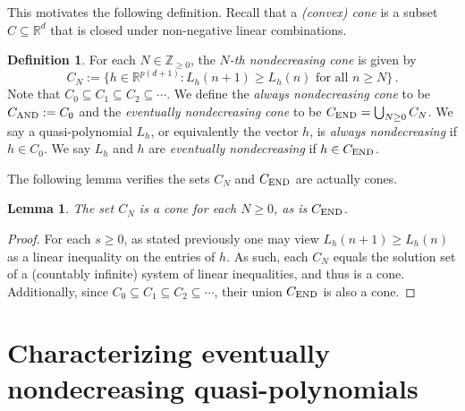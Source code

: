 \documentclass[12pt]{amsart}
\newtheorem{lemma}[thm]{Lemma}
\theoremstyle{definition}
\newtheorem{defn}[thm]{Definition}
\numberwithin{equation}{section}
\renewcommand\>{\rangle}
\newcommand\<{\langle}
\newcommand\0{\mathbf{0}}
\newcommand\RR{\mathbb{R}}
\newcommand\ZZ{\mathbb{Z}}
\begin{document}
This motivates the following definition.  
Recall that a \emph{(convex) cone} is a subset $C \subseteq \RR^d$ that is closed under non-negative linear combinations.

\begin{defn}\label{d:nondecreasingcone}
For each $N \in \ZZ_{\ge 0}$, the \emph{$N$-th nondecreasing cone} is given by
\[
C_N := \{h \in \RR^{p(d+1)} : L_h(n+1) \ge L_h(n) \text{ for all } n \ge N\} \, .
\]
Note that $C_0 \subseteq C_1 \subseteq C_2 \subseteq \cdots$.
We define the \emph{always nondecreasing cone} to be $C_\textnormal{AND} := C_0$ and the \emph{eventually nondecreasing cone} to be $C_\textnormal{END} = \bigcup_{N \ge 0} C_N$.
We say a quasi-polynomial $L_h$, or equivalently the vector $h$, is \emph{always nondecreasing} if $h\in C_0$.
We say $L_h$ and $h$ are \emph{eventually nondecreasing} if $h \in C_\textnormal{END}$.
\end{defn}

The following lemma verifies the sets $C_N$ and $C_\textnormal{END}$ are actually cones.

\begin{lemma}
The set $C_N$ is a cone for each $N\geq 0$, as is $C_\textnormal{END}$.  
\end{lemma}

\begin{proof}
For each $s \ge 0$, as stated previously one may view
$L_h(n+1) \ge L_h(n)$
as a linear inequality on the entries of $h$.  
As such, each $C_N$ equals the solution set of a (countably infinite) system of linear inequalities, and thus is a cone.  Additionally, since $C_0 \subseteq C_1 \subseteq C_2 \subseteq \cdots$, their union $C_\textnormal{END}$ is also a cone.  
\end{proof}


\section{Characterizing eventually nondecreasing quasi-polynomials}%
\label{sec:endcone}%
\end{document}
